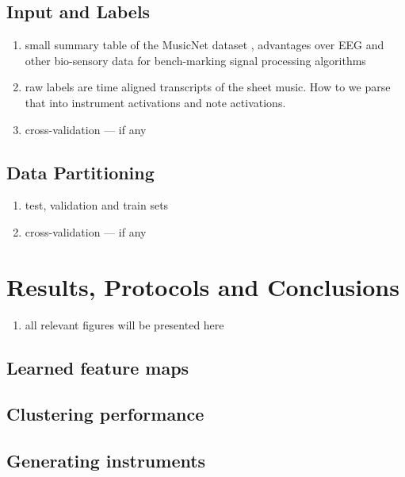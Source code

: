\documentclass{article}[12pt]
\numberwithin{equation}{section}
\begin{document}
\subsection{Input and Labels}
\begin{enumerate}
	\item small summary table of the MusicNet dataset \cite{Thickstun2016}, advantages
	over EEG and other bio-sensory data for bench-marking signal processing algorithms
	\item raw labels are time aligned transcripts of the sheet music. How to we
	parse that into instrument activations and note activations.
	\item cross-validation --- if any
\end{enumerate}

\subsection{Data Partitioning}
\begin{enumerate}
	\item test, validation and train sets
	\item cross-validation --- if any
\end{enumerate}

\section{Results, Protocols and Conclusions}
\begin{enumerate}
	\item all relevant figures will be presented here
\end{enumerate}
\subsection{Learned feature maps}

\subsection{Clustering performance}

\subsection{Generating instruments}



\end{document}
